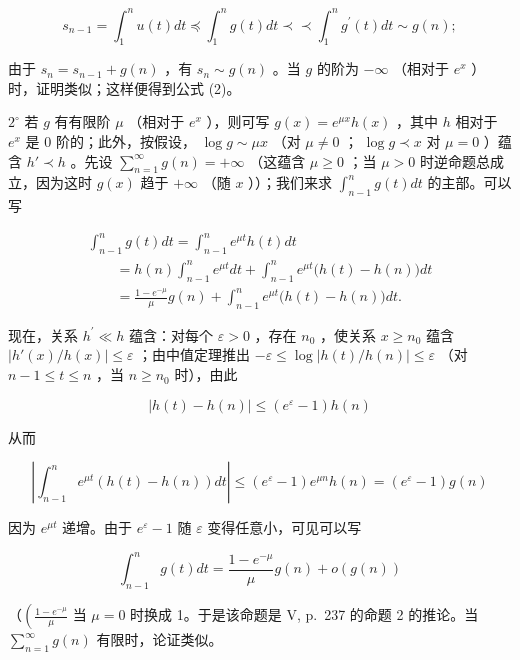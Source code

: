 \[
s _ {n - 1} = \int_ {1} ^ {n} u (t) d t \preccurlyeq \int_ {1} ^ {n} g (t) d t \prec \prec \int_ {1} ^ {n} g ^ {\prime} (t) d t \sim g (n);
\]

由于 \(s_n = s_{n-1} + g(n)\) ，有 \(s_n \sim g(n)\) 。当 \(g\) 的阶为 \(-\infty\) （相对于 \(e^x\) ）时，证明类似；这样便得到公式 (2)。

\(2^{\circ}\) 若 \(g\) 有有限阶 \(\mu\) （相对于 \(e^{x}\) ），则可写 \(g(x) = e^{\mu x}h(x)\) ，其中 \(h\) 相对于 \(e^{x}\) 是 0 阶的；此外，按假设， \(\log g \sim \mu x\) （对 \(\mu \neq 0\) ； \(\log g \prec x\) 对 \(\mu = 0\) ）蕴含 \(h' \prec h\) 。先设 \(\sum_{n=1}^{\infty} g(n) = +\infty\) （这蕴含 \(\mu \geqslant 0\) ；当 \(\mu > 0\) 时逆命题总成立，因为这时 \(g(x)\) 趋于 \(+\infty\) （随 \(x\) ））；我们来求 \(\int_{n-1}^{n} g(t) dt\) 的主部。可以写

\[
\begin{array}{l} \int_ {n - 1} ^ {n} g (t) d t = \int_ {n - 1} ^ {n} e ^ {\mu t} h (t) d t \\ \qquad = h (n) \int_ {n - 1} ^ {n} e ^ {\mu t} d t + \int_ {n - 1} ^ {n} e ^ {\mu t} \big (h (t) - h (n) \big) d t \\ \qquad = \frac {1 - e ^ {- \mu}}{\mu} g (n) + \int_ {n - 1} ^ {n} e ^ {\mu t} \big (h (t) - h (n) \big) d t. \end{array}
\]

现在，关系 \(h^{\prime} \ll h\) 蕴含：对每个 \(\varepsilon > 0\) ，存在 \(n_{0}\) ，使关系 \(x \geqslant n_{0}\) 蕴含 \(\left|h'(x)/h(x)\right| \leqslant \varepsilon\) ；由中值定理推出 \(-\varepsilon \leqslant \log |h(t)/h(n)| \leqslant \varepsilon\) （对 \(n - 1 \leqslant t \leqslant n\) ，当 \(n \geqslant n_{0}\) 时），由此

\[
| h (t) - h (n) | \leqslant \left(e ^ {\varepsilon} - 1\right) h (n)
\]

从而

\[
\left| \int_ {n - 1} ^ {n} e ^ {\mu t} (h (t) - h (n)) d t \right| \leqslant (e ^ {\varepsilon} - 1) e ^ {\mu n} h (n) = (e ^ {\varepsilon} - 1) g (n)
\]

因为 \(e^{\mu t}\) 递增。由于 \(e^{\varepsilon} - 1\) 随 \(\varepsilon\) 变得任意小，可见可以写

\[
\int_ {n - 1} ^ {n} g (t) d t = \frac {1 - e ^ {- \mu}}{\mu} g (n) + o (g (n))
\]

（\(\left(\frac{1 - e^{-\mu}}{\mu}\right.\) 当 \(\mu = 0\) 时换成 1。于是该命题是 V, p.~237 的命题 2 的推论。当 \(\sum_{n=1}^{\infty} g(n)\) 有限时，论证类似。


